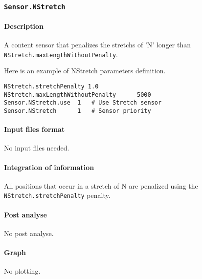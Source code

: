
\subsubsection{\texttt{Sensor.NStretch}}

\paragraph{Description}

A content sensor that penalizes the stretchs of 'N' longer than \texttt{NStretch.maxLengthW\-ithoutPenalty}.

Here is an example of NStretch parameters definition.
\begin{Verbatim}[fontsize=\small]
NStretch.stretchPenalty 1.0
NStretch.maxLengthWithoutPenalty      5000
Sensor.NStretch.use  1   # Use Stretch sensor
Sensor.NStretch      1   # Sensor priority
\end{Verbatim}

\paragraph{Input files format}

No input files  needed.

\paragraph{Integration of information}

All positions that occur in a stretch of N are penalized using the \texttt{NStretch.str\-etchPenalty} penalty.

\paragraph{Post analyse}

No post analyse.

\paragraph{Graph}

No plotting.

